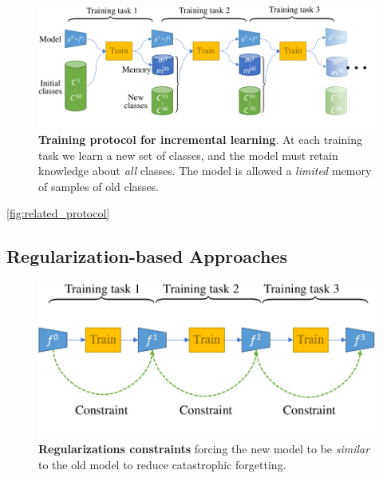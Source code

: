 \begin{figure}[tb]
    \begin{center}
        \includegraphics[width=1.0\linewidth]{images/podnet/protocol}
    \end{center}
    \caption{\textbf{Training protocol for incremental learning}. At each training task we learn a
        new set of classes, and the model must retain knowledge about \textit{all} classes. The
        model is allowed a \textit{limited} memory of samples of old classes.}
    \label{fig:related_protocol}
\end{figure}

\autoref{fig:related_protocol}


\subsection{Regularization-based Approaches}
\label{sec:related_regul}


\begin{figure}[tb]
    \begin{center}
        \includegraphics[width=1.0\linewidth]{images/related/continual_regularizations.pdf}
    \end{center}
    \caption{\textbf{Regularizations constraints} forcing the new model to be \textit{similar} to
        the old model to reduce catastrophic forgetting.}
    \label{fig:related_regul}
\end{figure}

